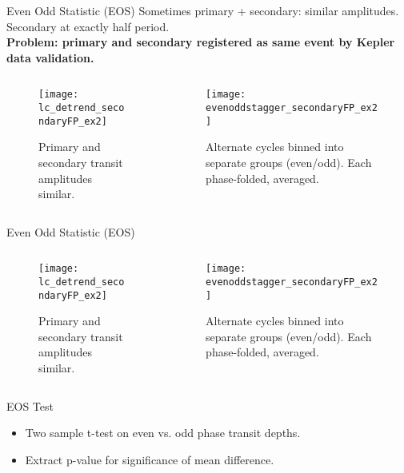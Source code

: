 \documentclass{beamer}
\begin{document}
\begin{frame}{Even Odd Statistic (EOS)}
Sometimes primary + secondary: similar amplitudes. Secondary at exactly half period. \\
\textbf{Problem: primary and secondary registered as same event by Kepler data validation.}
	\begin{columns}
	\begin{column}{0.5\textwidth}
		\begin{figure}
			\texttt{[image: lc\_detrend\_secondaryFP\_ex2]}
			\caption{Primary and secondary transit amplitudes similar.}
		\end{figure}
	\end{column}
	\begin{column}{0.5\textwidth}
		\begin{figure}
			\texttt{[image: evenoddstagger\_secondaryFP\_ex2]}
			\caption{Alternate cycles binned into separate groups (even/odd). Each phase-folded, averaged.}
		\end{figure}
	\end{column}
\end{columns}
\end{frame}

\begin{frame}{Even Odd Statistic (EOS)}

	\begin{columns}
		\begin{column}{0.5\textwidth}
			\begin{figure}
				\texttt{[image: lc\_detrend\_secondaryFP\_ex2]}
				\caption{Primary and secondary transit amplitudes similar.}
			\end{figure}
		\end{column}
		\begin{column}{0.5\textwidth}
			\begin{figure}
				\texttt{[image: evenoddstagger\_secondaryFP\_ex2]}
				\caption{Alternate cycles binned into separate groups (even/odd). Each phase-folded, averaged.}
			\end{figure}
		\end{column}
	\end{columns}
\begin{block}{EOS Test}
	\begin{itemize}
	\item Two sample t-test on even vs. odd phase transit depths.
	\item Extract p-value for significance of mean difference.
	\end{itemize}
	
\end{block}
\end{frame}
\end{document}
